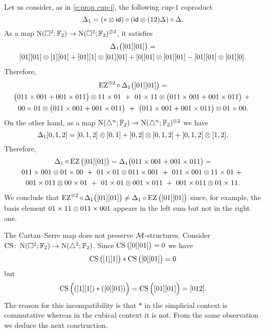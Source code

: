 \begin{example*}
	Let us consider, as in \cref{e:prop cup-i}, the following cup-$1$ coproduct
	\[
	\Delta_1 = (\ast \otimes \mathsf{id}) \circ (\mathsf{id} \otimes (12) \Delta) \circ \Delta.
	\]
	As a map $\operatorname{N}(\square^2; {\mathbb{F}_2}) \to \operatorname{N}(\square^2; {\mathbb{F}_2})^{\otimes 2}$, it satisfies
	\begin{multline*}
		\Delta_1 \big( [01] [01] \big) = \\
		[01][01] \otimes [1][01] + [01][1] \otimes [01][01] + [0][01] \otimes [01][01] - [01][01] \otimes [01][0].
	\end{multline*}
	Therefore,
	\begin{multline*}
		\operatorname{EZ}^{\otimes 2} \circ \, \Delta_1 \big( [01][01] \big) = \\
		\big( 011\times001 + 001\times011 \big) \otimes 11 \times 01 \ +\
		01\times11 \otimes \big( 011\times001 + 001\times011 \big) \ +\ \\
		00\times01 \otimes \big( 011\times001 + 001\times011 \big) \ +\
		\big( 011\times001 + 001\times011 \big) \otimes 01\times00.
	\end{multline*}
	On the other hand, as a map $\operatorname{N}(\triangle^n; {\mathbb{F}_2}) \to \operatorname{N}(\triangle^n; {\mathbb{F}_2})^{\otimes 2}$ we have
	\[
	\Delta_1 [0,1,2] = [0,1,2] \otimes [0,1] + [0,2] \otimes [0,1,2] + [0,1,2] \otimes [1,2].
	\]
	Therefore,
	\begin{multline*}
		\Delta_1 \circ \operatorname{EZ} \big( [01] [01] \big) = \Delta_1 \big( 011\times001 + 001\times011 \big) = \\
		011\times001 \otimes 01\times00 \ + \
		01\times01 \otimes 011\times001 \ + \
		011\times001 \otimes 11\times01 \ + \ \\
		001\times011 \otimes 00\times01 \ + \
		01\times01 \otimes 001\times011 \ + \
		001\times011 \otimes 01\times11.
	\end{multline*}
	We conclude that $\operatorname{EZ}^{\otimes 2} \circ \, \Delta_1 \big( [01][01] \big) \neq \Delta_1 \circ \operatorname{EZ} \big( [01] [01] \big)$ since, for example, the basis element $01\times11 \otimes 011\times001$ appears in the left sum but not in the right one.
\end{example*}

\begin{example*}
	The Cartan--Serre map does not preserve $\mathcal{M}$-structures.
	Consider $\operatorname{CS} \colon \operatorname{N}(\square^2; {\mathbb{F}_2}) \to \operatorname{N}(\triangle^2; {\mathbb{F}_2})$.
	Since $\operatorname{CS} \big( [0][01] \big) = 0$ we have
	\[
	\operatorname{CS} \big( [1][1] \big) \ast \operatorname{CS} \big( [0][01] \big) = 0
	\]
	but
	\[
	\operatorname{CS} \Big( ([1][1]) \ast ([0][01]) \Big) =
	\operatorname{CS} \Big( [01][01] \Big) = [012].
	\]
	The reason for this incompatibility is that $\ast$ in the simplicial context is commutative whereas in the cubical context it is not.
	From the same observation we deduce the next construction.
\end{example*}

